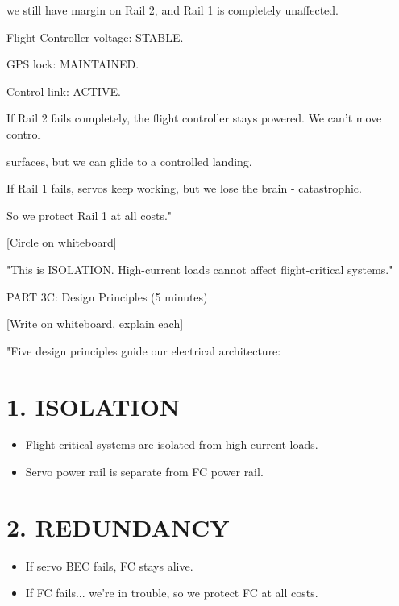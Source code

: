 \documentclass[11pt,letterpaper]{article}
\begin{document}
{we still have margin on Rail 2, and Rail 1 is completely unaffected.\par

Flight Controller voltage: STABLE.\par

GPS lock: MAINTAINED.\par

Control link: ACTIVE.\par

If Rail 2 fails completely, the flight controller stays powered. We can't move control\par

surfaces, but we can glide to a controlled landing.\par

If Rail 1 fails, servos keep working, but we lose the brain - catastrophic.\par

So we protect Rail 1 at all costs."\par

[Circle on whiteboard]\par

"This is ISOLATION. High-current loads cannot affect flight-critical systems."\par

PART 3C: Design Principles (5 minutes)\par

[Write on whiteboard, explain each]\par

"Five design principles guide our electrical architecture:\par

\section{1. ISOLATION}

\begin{itemize}
  \item Flight-critical systems are isolated from high-current loads.
  \item Servo power rail is separate from FC power rail.
\end{itemize}

\section{2. REDUNDANCY}

\begin{itemize}
  \item If servo BEC fails, FC stays alive.
  \item If FC fails... we're in trouble, so we protect FC at all costs.
\end{itemize}

}
\end{document}

